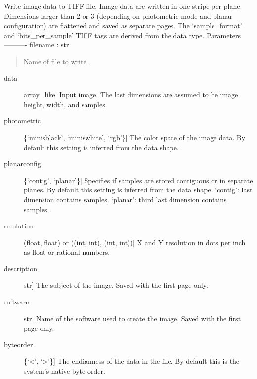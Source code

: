 \documentclass[letterpaper,10pt,english]{sphinxmanual}
\begin{document}
\begin{fulllineitems}
\label{tifffile:tifffile.imsave}
Write image data to TIFF file.
Image data are written in one stripe per plane.
Dimensions larger than 2 or 3 (depending on photometric mode and
planar configuration) are flattened and saved as separate pages.
The `sample\_format' and `bits\_per\_sample' TIFF tags are derived from
the data type.
Parameters
----------
filename : str
\begin{quote}

Name of file to write.
\end{quote}
\begin{description}
\item[{data}] \leavevmode{[}array\_like{]}
Input image. The last dimensions are assumed to be image height,
width, and samples.

\item[{photometric}] \leavevmode{[}\{`minisblack', `miniswhite', `rgb'\}{]}
The color space of the image data.
By default this setting is inferred from the data shape.

\item[{planarconfig}] \leavevmode{[}\{`contig', `planar'\}{]}
Specifies if samples are stored contiguous or in separate planes.
By default this setting is inferred from the data shape.
`contig': last dimension contains samples.
`planar': third last dimension contains samples.

\item[{resolution}] \leavevmode{[}(float, float) or ((int, int), (int, int)){]}
X and Y resolution in dots per inch as float or rational numbers.

\item[{description}] \leavevmode{[}str{]}
The subject of the image. Saved with the first page only.

\item[{software}] \leavevmode{[}str{]}
Name of the software used to create the image.
Saved with the first page only.

\item[{byteorder}] \leavevmode{[}\{`\textless{}', `\textgreater{}'\}{]}
The endianness of the data in the file.
By default this is the system's native byte order.


\end{description}
\end{fulllineitems}
\end{document}

